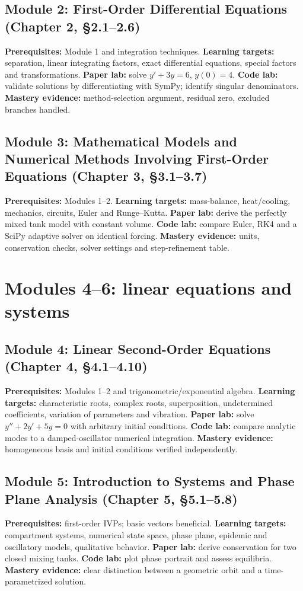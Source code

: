 \documentclass[11pt,letterpaper,oneside]{report}
\theoremstyle{definition}\newtheorem{definition}[theorem]{Definition}
\theoremstyle{remark}\newtheorem{remark}[theorem]{Remark}
\begin{document}
\section{Module 2: First-Order Differential Equations (Chapter 2, \S2.1--2.6)}
\textbf{Prerequisites:} Module 1 and integration techniques. \textbf{Learning targets:} separation, linear integrating factors, exact differential equations, special factors and transformations. \textbf{Paper lab:} solve $y'+3y=6$, $y(0)=4$. \textbf{Code lab:} validate solutions by differentiating with SymPy; identify singular denominators. \textbf{Mastery evidence:} method-selection argument, residual zero, excluded branches handled.
\section{Module 3: Mathematical Models and Numerical Methods Involving First-Order Equations (Chapter 3, \S3.1--3.7)}
\textbf{Prerequisites:} Modules 1--2. \textbf{Learning targets:} mass-balance, heat/cooling, mechanics, circuits, Euler and Runge--Kutta. \textbf{Paper lab:} derive the perfectly mixed tank model with constant volume. \textbf{Code lab:} compare Euler, RK4 and a SciPy adaptive solver on identical forcing. \textbf{Mastery evidence:} units, conservation checks, solver settings and step-refinement table.
\chapter{Modules 4--6: linear equations and systems}
\section{Module 4: Linear Second-Order Equations (Chapter 4, \S4.1--4.10)}
\textbf{Prerequisites:} Modules 1--2 and trigonometric/exponential algebra. \textbf{Learning targets:} characteristic roots, complex roots, superposition, undetermined coefficients, variation of parameters and vibration. \textbf{Paper lab:} solve $y''+2y'+5y=0$ with arbitrary initial conditions. \textbf{Code lab:} compare analytic modes to a damped-oscillator numerical integration. \textbf{Mastery evidence:} homogeneous basis and initial conditions verified independently.
\section{Module 5: Introduction to Systems and Phase Plane Analysis (Chapter 5, \S5.1--5.8)}
\textbf{Prerequisites:} first-order IVPs; basic vectors beneficial. \textbf{Learning targets:} compartment systems, numerical state space, phase plane, epidemic and oscillatory models, qualitative behavior. \textbf{Paper lab:} derive conservation for two closed mixing tanks. \textbf{Code lab:} plot phase portrait and assess equilibria. \textbf{Mastery evidence:} clear distinction between a geometric orbit and a time-parametrized solution.
\end{document}

